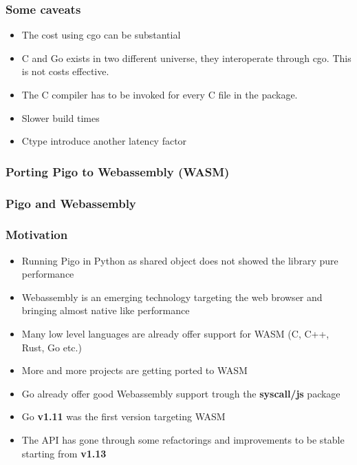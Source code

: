 \documentclass[9pt]{beamer}
\begin{document}
\begin{frame}[fragile]
\frametitle{Some caveats}


\begin{itemize}
\item The cost using cgo can be substantial
\item C and Go exists in two different universe, they interoperate through cgo. This is not costs effective.
\item The C compiler has to be invoked for every C file in the package.
\item Slower build times
\item Ctype introduce another latency factor
\end{itemize}


\end{frame}

\begin{frame}[fragile]
\frametitle{Porting Pigo to Webassembly (WASM)}


\end{frame}

\begin{frame}[fragile]
\frametitle{Pigo and Webassembly}


\end{frame}

\begin{frame}[fragile]
\frametitle{Motivation}


\begin{itemize}
\item Running Pigo in Python as shared object does not showed the library pure performance
\item Webassembly is an emerging technology targeting the web browser and bringing almost native like performance
\item Many low level languages are already offer support for WASM (C, C++, Rust, Go etc.)
\item More and more projects are getting ported to WASM
\item Go already offer good Webassembly support trough the \textbf{syscall/js} package
\item Go \textbf{v1.11} was the first version targeting WASM
\item The API has gone through some refactorings and improvements to be stable starting from \textbf{v1.13}
\end{itemize}


\end{frame}
\end{document}

